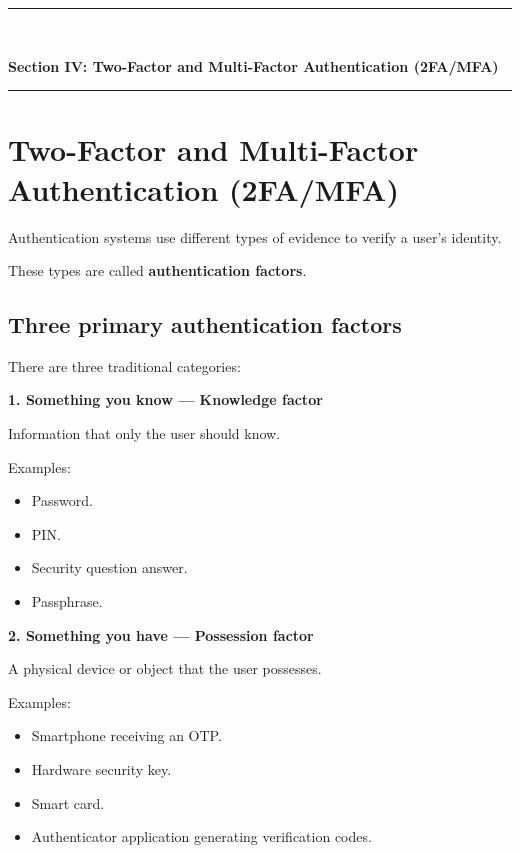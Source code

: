 \newpage
\begin{center}
\vspace{0.5em}
{\color{primary}\rule{0.45\textwidth}{1.2pt}\\[4pt]}
{\Large\bfseries\color{primary} Section IV: Two-Factor and Multi-Factor Authentication (2FA/MFA)\\[2pt]}
{\color{primary}\rule{0.45\textwidth}{1.2pt}}
\vspace{0.5em}
\end{center}

\section{Two-Factor and Multi-Factor Authentication (2FA/MFA)}


Authentication systems use different types of evidence to verify a user's identity.

These types are called \textbf{authentication factors}.

\subsection{Three primary authentication factors}

There are three traditional categories:

\textbf{1. Something you know --- Knowledge factor}

Information that only the user should know.

Examples:

\begin{itemize}
\item Password.
\item PIN.
\item Security question answer.
\item Passphrase.
\end{itemize}

\textbf{2. Something you have --- Possession factor}

A physical device or object that the user possesses.

Examples:

\begin{itemize}
\item Smartphone receiving an OTP.
\item Hardware security key.
\item Smart card.
\item Authenticator application generating verification codes.
\end{itemize}

